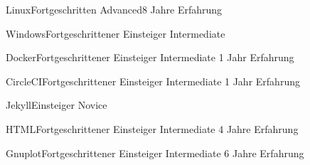 \documentclass[a4paper,10pt]{cv}
\begin{document}
      \vspace{-1.8em}
      \begin{multicols}{2}
        \begin{cvSkillItem}{Linux}{Fortgeschritten}
          Advanced\hfill 8 Jahre Erfahrung
        \end{cvSkillItem}
        \begin{cvSkillItem}{Windows}{Fortgeschrittener Einsteiger}
          Intermediate
        \end{cvSkillItem}
        \begin{cvSkillItem}{Docker}{Fortgeschrittener Einsteiger}
          Intermediate \hfill 1 Jahr Erfahrung
        \end{cvSkillItem}
        \begin{cvSkillItem}{CircleCI}{Fortgeschrittener Einsteiger}
          Intermediate \hfill 1 Jahr Erfahrung
        \end{cvSkillItem}
        \begin{cvSkillItem}{Jekyll}{Einsteiger}
          Novice
        \end{cvSkillItem}
        \begin{cvSkillItem}{HTML}{Fortgeschrittener Einsteiger}
          Intermediate \hfill 4 Jahre Erfahrung
        \end{cvSkillItem}
        \begin{cvSkillItem}{Gnuplot}{Fortgeschrittener Einsteiger}
          Intermediate \hfill 6 Jahre Erfahrung
        \end{cvSkillItem}
      \end{multicols}
\end{document}
